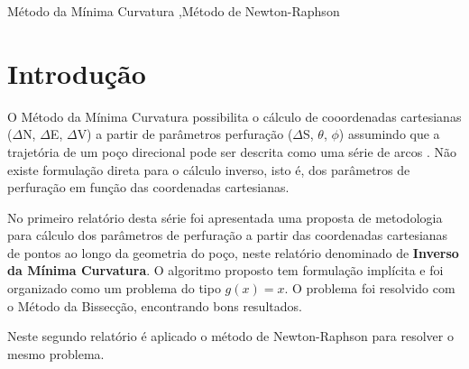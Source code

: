 \documentclass[final,5p]{elsarticle}
\numberwithin{equation}{section}
\begin{document}
\begin{frontmatter}
\begin{abstract}
\end{abstract}




\begin{keyword}
    Método da Mínima Curvatura \sep Método de Newton-Raphson



\end{keyword}

\end{frontmatter}


\section{Introdução}

O Método da Mínima Curvatura possibilita o cálculo de cooordenadas cartesianas ($\Delta$N, $\Delta$E, $\Delta$V) a partir de parâmetros perfuração ($\Delta$S, $\theta$, $\phi$) assumindo que a trajetória de um poço direcional pode ser descrita como uma série de arcos \cite{10.2118/84246-MS}. Não existe formulação direta para o cálculo inverso, isto é, dos parâmetros de perfuração em função das coordenadas cartesianas.

No primeiro relatório desta série \cite{relatoriobisseccao} foi apresentada uma proposta de metodologia para cálculo dos parâmetros de perfuração a partir das coordenadas cartesianas de pontos ao longo da geometria do poço, neste relatório denominado de \textbf{Inverso da Mínima Curvatura}. O algoritmo proposto tem formulação implícita e foi organizado como um problema do tipo $g(x)=x$. O problema foi resolvido com o Método da Bissecção, encontrando bons resultados.

Neste segundo relatório é aplicado o método de Newton-Raphson para resolver o mesmo problema.
\end{document}
